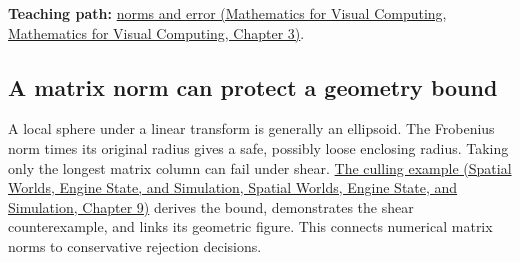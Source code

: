 \textbf{Teaching path:} \href{../02-Mathematics-for-Visual-Computing/main.pdf\#nameddest=01-foundations-i-ch019-matrix-norms-give-scale-to-residuals-and-error-claims}{norms and error (Mathematics for Visual Computing, Mathematics for Visual Computing, Chapter 3)}.

\subsection{A matrix norm can protect a geometry bound}\label{appendix-f8657bac66e5-a-matrix-norm-can-protect-a-geometry-bound}

A local sphere under a linear transform is generally an ellipsoid. The Frobenius norm times its original radius gives a safe, possibly loose enclosing radius. Taking only the longest matrix column can fail under shear. \href{../05-Spatial-Worlds-Engine-State-and-Simulation/main.pdf\#nameddest=04-visual-computing-ii-ch028-a-line-corridor-can-be-a-cheap-prefilter-for-shadow-caster-work}{The culling example (Spatial Worlds, Engine State, and Simulation, Spatial Worlds, Engine State, and Simulation, Chapter 9)} derives the bound, demonstrates the shear counterexample, and links its geometric figure. This connects numerical matrix norms to conservative rejection decisions.
